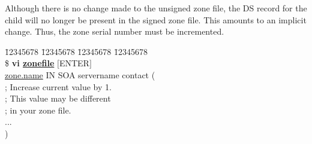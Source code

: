 Although there is no change made to the unsigned zone file, the DS record for
the child will no longer be present in the signed zone file.  This amounts to
an implicit change.  Thus, the zone serial number must be incremented.
\begin{tabbing}
\hspace{0.5in} \= 12345678 \= 12345678 \= 12345678 \= 12345678 \kill \\
\hspace{0.5in}\$ {\bf vi \underline{zonefile}} $[$ENTER$]$ \\
\hspace{0.5in}\underline{zone.name}        IN     SOA        servername contact ( \\
\hspace{3.5in}{\bf 2005092109} ; Increase current value by 1. \\
\hspace{4.4in};  This value may be different \\
\hspace{4.4in}; in your zone file. \\
\hspace{0.5in}\>           \>         ... \\
\hspace{0.5in}\>              ) \\
\end{tabbing}



